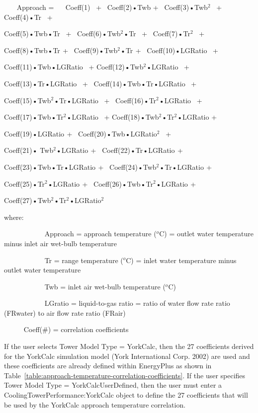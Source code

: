 ~~~ Approach = ~~ Coeff(1)~ +~ Coeff(2)•Twb +~ Coeff(3)•Twb\(^{2}\)~ +~ Coeff(4)•Tr~ +

Coeff(5)•Twb•Tr~ +~ Coeff(6)•Twb\(^{2}\)•Tr~ +~ Coeff(7)•Tr\(^{2}\)~ +

Coeff(8)•Twb•Tr\(^{ }\) +~ Coeff(9)•Twb\(^{2}\)•Tr\(^{ }\) +~ Coeff(10)•LGRatio~ +

Coeff(11)•Twb•LGRatio~ + Coeff(12)•Twb\(^{2}\)•LGRatio~ +

Coeff(13)•Tr•LGRatio~ +~ Coeff(14)•Twb•Tr•LGRatio~ +

Coeff(15)•Twb\(^{2}\)•Tr•LGRatio~ +~ Coeff(16)•Tr\(^{2}\)•LGRatio~ +

Coeff(17)•Twb•Tr\(^{2}\)•LGRatio~ + Coeff(18)•Twb\(^{2}\)•Tr\(^{2}\)•LGRatio +

Coeff(19)•LGRatio\(^{ }\) +~ Coeff(20)•Twb•LGRatio\(^{2}\)~ +

Coeff(21)• Twb\(^{2}\)•LGRatio\(^{ }\) +~ Coeff(22)•Tr•LGRatio\(^{ }\) +

Coeff(23)•Twb•Tr•LGRatio\(^{ }\) +~ Coeff(24)•Twb\(^{2}\)•Tr•LGRatio\(^{ }\) +

Coeff(25)•Tr\(^{2}\)•LGRatio\(^{ }\) +~ Coeff(26)•Twb•Tr\(^{2}\)•LGRatio\(^{ }\) +

Coeff(27)•Twb\(^{2}\)•Tr\(^{2}\)•LGRatio\(^{2}\)

where:

~~~~~~~~~~~ Approach = approach temperature (\(^{o}\)C) = outlet water temperature minus inlet air wet-bulb temperature

~~~~~~~~~~~ Tr = range temperature (\(^{o}\)C) = inlet water temperature minus outlet water temperature

~~~~~~~~~~~ Twb = inlet air wet-bulb temperature (\(^{o}\)C)

~~~~~~~~~~~ LGratio = liquid-to-gas ratio = ratio of water flow rate ratio (FRwater) to air flow rate ratio (FRair)

~~~~~ Coeff(\#) = correlation coefficients

If the user selects Tower Model Type = YorkCalc, then the 27 coefficients derived for the YorkCalc simulation model (York International Corp. 2002) are used and these coefficients are already defined within EnergyPlus as shown in Table~\ref{table:approach-temperature-correlation-coefficients}. If the user specifies Tower Model Type = YorkCalcUserDefined, then the user must enter a CoolingTowerPerformance:YorkCalc object to define the 27 coefficients that will be used by the YorkCalc approach temperature correlation.

